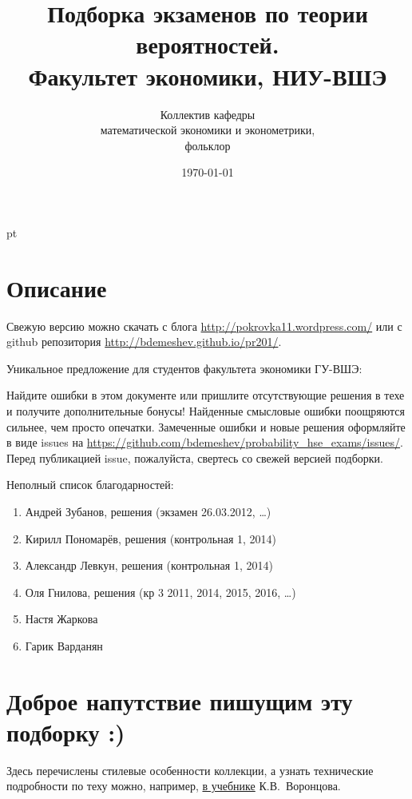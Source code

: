 \documentclass[12pt, a4paper]{article}\usepackage[]{graphicx}\usepackage[]{color}
\title{Подборка экзаменов по теории вероятностей. \\Факультет экономики, НИУ-ВШЭ}
\date{\today}
\author{Коллектив кафедры \\
математической экономики и эконометрики,\\
 фольклор}
\begin{document}
\maketitle

\tableofcontents{}


 pt %

\section{Описание}

Свежую версию можно скачать с блога \url{http://pokrovka11.wordpress.com/} или с github репозитория \url{http://bdemeshev.github.io/pr201/}.


Уникальное предложение для студентов факультета экономики ГУ-ВШЭ:


Найдите ошибки в этом документе или пришлите отсутствующие решения в техе и получите дополнительные бонусы! Найденные смысловые ошибки поощряются сильнее, чем просто опечатки. Замеченные ошибки и новые решения оформляйте в виде issues на \url{https://github.com/bdemeshev/probability_hse_exams/issues/}. Перед публикацией issue, пожалуйста, свертесь со свежей версией подборки.

Неполный список благодарностей:

\begin{enumerate}
\item Андрей Зубанов, решения (экзамен 26.03.2012, \ldots)
\item Кирилл Пономарёв, решения (контрольная 1, 2014)
\item Александр Левкун, решения (контрольная 1, 2014)
\item Оля Гнилова, решения (кр 3 2011, 2014, 2015, 2016, \ldots)
\item Настя Жаркова
\item Гарик Варданян
\end{enumerate}


\section{Доброе напутствие пишущим эту подборку :)}

Здесь перечислены стилевые особенности коллекции, а узнать технические подробности по теху можно, например, \href{http://www.ccas.ru/voron/download/voron05latex.pdf}{в учебнике} К.В. Воронцова.
\end{document}
